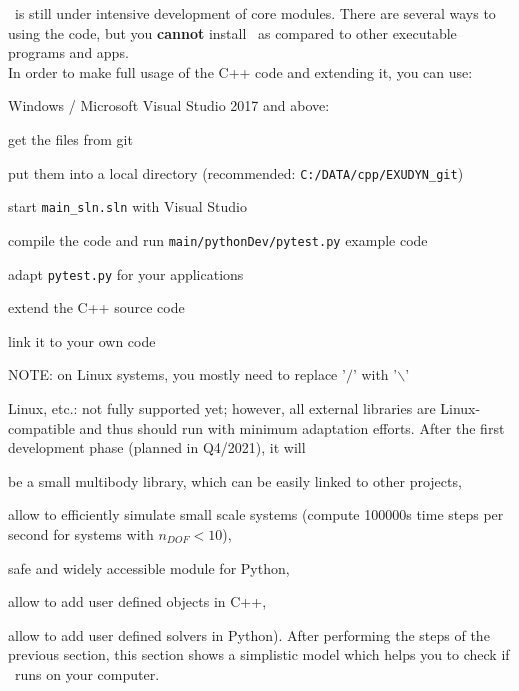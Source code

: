%
\codeName\ is still under intensive development of core modules.
There are several ways to using the code, but you {\bf cannot} install \codeName\ as compared to other executable programs and apps.
\vspace{6pt}\\
In order to make full usage of the C++ code and extending it, you can use:
\bi
	\item Windows / Microsoft Visual Studio 2017 and above:
	\bi
		\item get the files from git
		\item put them into a local directory (recommended: \texttt{C:/DATA/cpp/EXUDYN\_git})
		\item start \texttt{main\_sln.sln} with Visual Studio
		\item compile the code and run \texttt{main/pythonDev/pytest.py} example code
		\item adapt \texttt{pytest.py} for your applications
		\item extend the C++ source code
		\item link it to your own code
		\item NOTE: on Linux systems, you mostly need to replace '$/$' with '$\backslash$'
	\ei
	\item Linux, etc.: not fully supported yet; however, all external libraries are Linux-compatible and thus should run with minimum adaptation efforts.
\ei
%
After the first development phase (planned in Q4/2021), it will
\bi
  \item be a small multibody library, which can be easily linked to other projects,
	\item allow to efficiently simulate small scale systems (compute 100000s time steps per second for systems with $n_{DOF}<10$),
	\item safe and widely accessible module for Python,
	\item allow to add user defined objects in C++,
	\item allow to add user defined solvers in Python).
\ei
%
After performing the steps of the previous section, this section shows a simplistic model which helps you to check if \codeName\ runs on your computer.

